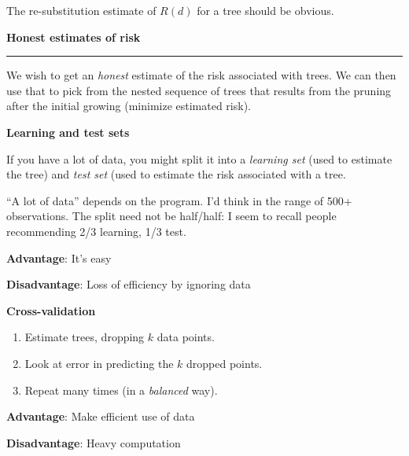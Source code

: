 \documentclass[12pt,letterpaper]{article}
\newcommand{\HRule}{\rule{\linewidth}{4pt}}
\newcommand{\hspone}{\hspace*{1cm}}
\newcommand{\vsphalf}{\vspace*{0.5cm}}
\begin{document}
The re-substitution estimate of $R(d)$ for a tree should be obvious.







\newpage

\fontsize{30}{30} \selectfont

\centerline{\textbf{Honest estimates of risk}}

\HRule

\vsphalf

\fontsize{20}{25} \selectfont

We wish to get an \emph{honest\/} estimate of the risk associated with
trees.  We can then use that to pick from the nested sequence of trees
that results from the pruning after the initial growing (minimize
estimated risk).  

\vsphalf

\textbf{Learning and test sets}

If you have a lot of data, you might split it into a \emph{learning
set\/} (used to estimate the tree) and \emph{test set\/} (used to
estimate the risk associated with a tree.  

\bigskip

``A lot of data'' depends on the program.  I'd think in the range of
500+ observations.  The split need not be half/half: I seem to recall
people recommending 2/3 learning, 1/3 test.  

\bigskip

\hspone \textbf{Advantage}: It's easy

\hspone \textbf{Disadvantage}: Loss of efficiency by ignoring data

\vsphalf

\textbf{Cross-validation}

\begin{enumerate}
\item Estimate trees, dropping $k$ data points.
\item Look at error in predicting the $k$ dropped points.
\item Repeat many times (in a \emph{balanced\/} way).
\end{enumerate}

\hspone \textbf{Advantage}: Make efficient use of data

\hspone \textbf{Disadvantage}: Heavy computation
\end{document}
